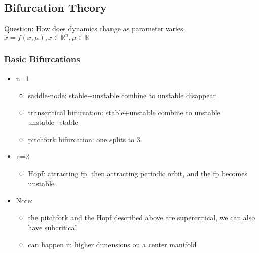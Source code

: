 \documentclass[10pt,a4paper]{article}
\begin{document}
\subsection{Bifurcation Theory}
Question: How does dynamics change as parameter varies.\\
$\dot{x}=f(x,\mu),x\in\mathbb{R}^n,\mu\in\mathbb{R}$

\subsubsection{Basic Bifurcations}
\begin{itemize}
	\item n=1
	\begin{itemize}
		\item saddle-node: stable+unstable \textrightarrow  combine to unstable \textrightarrow  disappear
		\item transcritical bifurcation: stable+unstable \textrightarrow  combine to unstable \textrightarrow  unstable+stable
		\item pitchfork bifurcation: one splits to 3
	\end{itemize}
	\item n=2
	\begin{itemize}
		\item Hopf: attracting fp, then attracting periodic orbit, and the fp becomes unstable
	\end{itemize}
	\item Note:
	\begin{itemize}
		\item the pitchfork and the Hopf described above are supercritical, we can also have subcritical
		\item can happen in higher dimensions on a center manifold
	\end{itemize}
	
\end{itemize}
\end{document}
